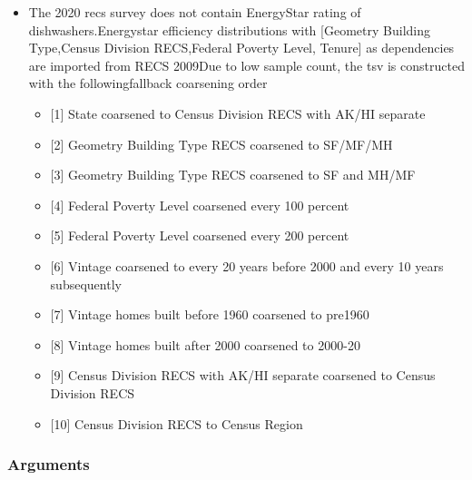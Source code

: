 \begin{itemize}
 
\item
  The 2020 recs survey does not contain EnergyStar rating of
  dishwashers.Energystar efficiency distributions with {[}Geometry
  Building Type,Census Division RECS,Federal Poverty Level, Tenure{]} as
  dependencies are imported from RECS 2009Due to low sample count, the
  tsv is constructed with the followingfallback coarsening order

  \begin{itemize}
   
  \item
    {[}1{]} State coarsened to Census Division RECS with AK/HI separate
  \item
    {[}2{]} Geometry Building Type RECS coarsened to SF/MF/MH
  \item
    {[}3{]} Geometry Building Type RECS coarsened to SF and MH/MF
  \item
    {[}4{]} Federal Poverty Level coarsened every 100 percent
  \item
    {[}5{]} Federal Poverty Level coarsened every 200 percent
  \item
    {[}6{]} Vintage coarsened to every 20 years before 2000 and every 10
    years subsequently
  \item
    {[}7{]} Vintage homes built before 1960 coarsened to pre1960
  \item
    {[}8{]} Vintage homes built after 2000 coarsened to 2000-20
  \item
    {[}9{]} Census Division RECS with AK/HI separate coarsened to Census
    Division RECS
  \item
    {[}10{]} Census Division RECS to Census Region
  \end{itemize}
\end{itemize}

\subsubsection{Arguments}\label{arguments-19}

